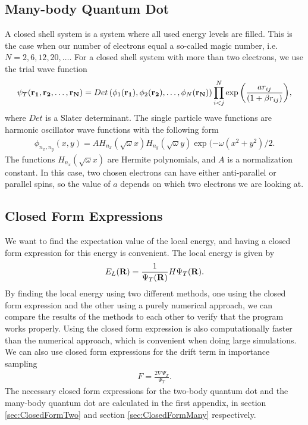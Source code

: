 \documentclass[../main.tex]{subfiles}
\begin{document}
\subsection{Many-body Quantum Dot}
A closed shell system is a system where all used energy levels are filled. This is the case when our number of electrons equal a so-called magic number, i.e. $N=2,6,12,20,\dots$. For a closed shell system with more than two electrons, we use the trial wave function 
\begin{align}
    \psi_{T}({\bf r_1},{\bf r_2},\dots, {\bf r_N}) = 
   Det\left(\phi_{1}({\bf r_1}),\phi_{2}({\bf r_2}),
   \dots,\phi_{N}({\bf r_N})\right)
   \prod_{i<j}^{N}\exp{\left(\frac{a r_{ij}}{(1+\beta r_{ij})}\right)}, 
\end{align}
where $Det$ is a Slater determinant. The single particle wave functions
are harmonic oscillator wave functions with the following form
\begin{align}\label{eq: HO SPWF}
    \phi_{n_x,n_y}(x,y) = A H_{n_x}(\sqrt{\omega}x)H_{n_y}(\sqrt{\omega}y)\exp{(-\omega(x^2+y^2)/2}.
\end{align}
The functions $H_{n_x}(\sqrt{\omega}x)$ are Hermite polynomials, and $A$ is a normalization constant. In this case, two chosen electrons can have either anti-parallel or parallel spins, so the value of $a$ depends on which two electrons we are looking at.

\subsection{Closed Form Expressions}\label{sec:CF}
We want to find the expectation value of the local energy, and having a closed form expression for this energy is convenient. The local energy is given by 
\begin{align}\label{eq: E_L}
    E_L({\bf R})=\frac{1}{\Psi_T({\bf R})}H\Psi_T({\bf R}).
\end{align}
By finding the local energy using two different methods, one using the closed form expression and the other using a purely numerical approach, we can compare the results of the methods to each other to verify that the program works properly. Using the closed form expression is also computationally faster than the numerical approach, which is convenient when doing large simulations. We can also use closed form expressions for the drift term in importance sampling 
\begin{align}
    F = \frac{2\nabla \Psi_T}{\Psi_T}.    
\end{align}
The necessary closed form expressions for the two-body quantum dot and the many-body quantum dot are calculated in the first appendix, in section \ref{sec:ClosedFormTwo} and section \ref{sec:ClosedFormMany} respectively.
\end{document}
